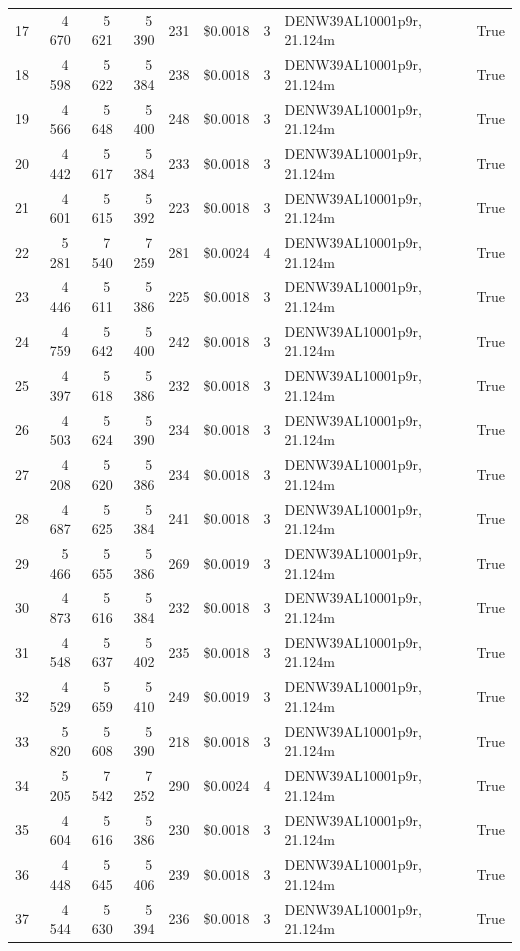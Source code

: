 \documentclass[a4paper,11pt]{article}
\begin{document}
\begin{table}[ht]
\begin{tabular}{r r r r r r r p{3cm} l}
17 & 4\,670 & 5\,621 & 5\,390 & 231 & \$0.0018 & 3 & DENW39AL10001p9r, 21.124m & True \\
18 & 4\,598 & 5\,622 & 5\,384 & 238 & \$0.0018 & 3 & DENW39AL10001p9r, 21.124m & True \\
19 & 4\,566 & 5\,648 & 5\,400 & 248 & \$0.0018 & 3 & DENW39AL10001p9r, 21.124m & True \\
20 & 4\,442 & 5\,617 & 5\,384 & 233 & \$0.0018 & 3 & DENW39AL10001p9r, 21.124m & True \\
21 & 4\,601 & 5\,615 & 5\,392 & 223 & \$0.0018 & 3 & DENW39AL10001p9r, 21.124m & True \\
22 & 5\,281 & 7\,540 & 7\,259 & 281 & \$0.0024 & 4 & DENW39AL10001p9r, 21.124m & True \\
23 & 4\,446 & 5\,611 & 5\,386 & 225 & \$0.0018 & 3 & DENW39AL10001p9r, 21.124m & True \\
24 & 4\,759 & 5\,642 & 5\,400 & 242 & \$0.0018 & 3 & DENW39AL10001p9r, 21.124m & True \\
25 & 4\,397 & 5\,618 & 5\,386 & 232 & \$0.0018 & 3 & DENW39AL10001p9r, 21.124m & True \\
26 & 4\,503 & 5\,624 & 5\,390 & 234 & \$0.0018 & 3 & DENW39AL10001p9r, 21.124m & True \\
27 & 4\,208 & 5\,620 & 5\,386 & 234 & \$0.0018 & 3 & DENW39AL10001p9r, 21.124m & True \\
28 & 4\,687 & 5\,625 & 5\,384 & 241 & \$0.0018 & 3 & DENW39AL10001p9r, 21.124m & True \\
29 & 5\,466 & 5\,655 & 5\,386 & 269 & \$0.0019 & 3 & DENW39AL10001p9r, 21.124m & True \\
30 & 4\,873 & 5\,616 & 5\,384 & 232 & \$0.0018 & 3 & DENW39AL10001p9r, 21.124m & True \\
31 & 4\,548 & 5\,637 & 5\,402 & 235 & \$0.0018 & 3 & DENW39AL10001p9r, 21.124m & True \\
32 & 4\,529 & 5\,659 & 5\,410 & 249 & \$0.0019 & 3 & DENW39AL10001p9r, 21.124m & True \\
33 & 5\,820 & 5\,608 & 5\,390 & 218 & \$0.0018 & 3 & DENW39AL10001p9r, 21.124m & True \\
34 & 5\,205 & 7\,542 & 7\,252 & 290 & \$0.0024 & 4 & DENW39AL10001p9r, 21.124m & True \\
35 & 4\,604 & 5\,616 & 5\,386 & 230 & \$0.0018 & 3 & DENW39AL10001p9r, 21.124m & True \\
36 & 4\,448 & 5\,645 & 5\,406 & 239 & \$0.0018 & 3 & DENW39AL10001p9r, 21.124m & True \\
37 & 4\,544 & 5\,630 & 5\,394 & 236 & \$0.0018 & 3 & DENW39AL10001p9r, 21.124m & True \\

\end{tabular}
\end{table}
\end{document}

